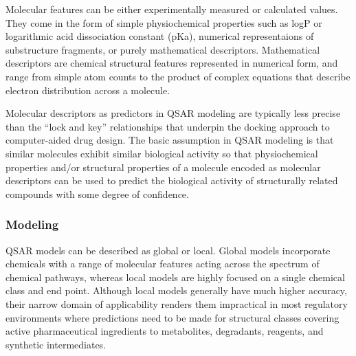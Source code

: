 
Molecular features can be either experimentally measured or calculated values. They come in the form of simple physiochemical properties such as logP or logarithmic acid dissociation constant (pKa), numerical representaions of substructure fragments, or purely mathematical descriptors. Mathematical descriptors are chemical structural features represented in numerical form, and range from simple atom counts to the product of complex equations that describe electron distribution across a molecule. \cite{Kruhlak2012}

Molecular descriptors as predictors in QSAR modeling are typically less precise than the “lock and key” relationships that underpin the docking approach to computer-aided drug design. The basic assumption in QSAR modeling is that similar molecules exhibit similar biological activity so that physiochemical properties and/or structural properties of a molecule encoded as molecular descriptors can be used to predict the biological activity of structurally related compounds with some degree of confidence.

\subsubsection{Modeling}
QSAR models can be described as global or local. Global models incorporate chemicals with a range of molecular features acting across the spectrum of chemical pathways, whereas local models are highly focused on a single chemical class and end point. Although local models generally have much higher accuracy, their narrow domain of applicability renders them impractical in most regulatory environments where predictions need to be made for structural classes covering active pharmaceutical ingredients to metabolites, degradants, reagents, and synthetic intermediates. \cite{Kruhlak2012}

